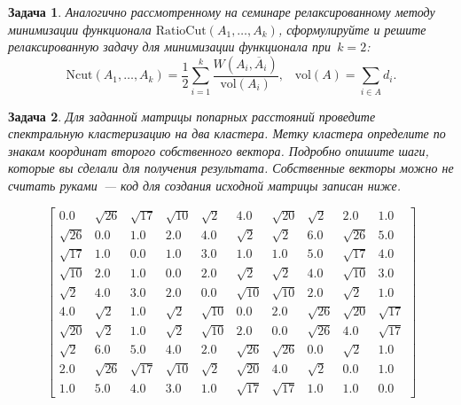 \documentclass[12pt,fleqn]{article}
\newtheorem{esProblem}{Задача}
\begin{document}
\begin{esProblem}
	Аналогично рассмотренному на семинаре релаксированному методу минимизации функционала $\text{RatioCut}(A_1,\ldots,A_k)$, сформулируйте и решите релаксированную задачу для минимизации функционала при~$k = 2$:
	\[
	\text{Ncut}(A_1,\ldots,A_k) = \frac12 \sum_{i=1}^k\frac{W(A_i, \overline{A}_i)}{\text{vol}(A_i)}, \;\;\; \text{vol}(A) = \sum_{i\in A} d_i.
	\]
\end{esProblem}

\begin{esProblem}

Для заданной матрицы попарных расстояний проведите спектральную кластеризацию на два кластера.
Метку кластера определите по знакам координат второго собственного вектора.
Подробно опишите шаги, которые вы сделали для получения результата.
Собственные векторы можно не считать руками~--- код для создания исходной матрицы записан ниже.

\[
\begin{bmatrix}
0.0 & \sqrt{26} & \sqrt{17} & \sqrt{10} & \sqrt{2} & 4.0 & \sqrt{20} & \sqrt{2} & 2.0 & 1.0 \\
\sqrt{26} & 0.0 & 1.0 & 2.0 & 4.0 & \sqrt{2} & \sqrt{2} & 6.0 & \sqrt{26} & 5.0 \\
\sqrt{17} & 1.0 & 0.0 & 1.0 & 3.0 & 1.0 & 1.0 & 5.0 & \sqrt{17} & 4.0 \\
\sqrt{10} & 2.0 & 1.0 & 0.0 & 2.0 & \sqrt{2} & \sqrt{2} & 4.0 & \sqrt{10} & 3.0 \\
\sqrt{2} & 4.0 & 3.0 & 2.0 & 0.0 & \sqrt{10} & \sqrt{10} & 2.0 & \sqrt{2} & 1.0 \\
4.0 & \sqrt{2} & 1.0 & \sqrt{2} & \sqrt{10} & 0.0 & 2.0 & \sqrt{26} & \sqrt{20} & \sqrt{17} \\
\sqrt{20} & \sqrt{2} & 1.0 & \sqrt{2} & \sqrt{10} & 2.0 & 0.0 & \sqrt{26} & 4.0 & \sqrt{17} \\
\sqrt{2} & 6.0 & 5.0 & 4.0 & 2.0 & \sqrt{26} & \sqrt{26} & 0.0 & \sqrt{2} & 1.0 \\
2.0 & \sqrt{26} & \sqrt{17} & \sqrt{10} & \sqrt{2} & \sqrt{20} & 4.0 & \sqrt{2} & 0.0 & 1.0 \\
1.0 & 5.0 & 4.0 & 3.0 & 1.0 & \sqrt{17} & \sqrt{17} & 1.0 & 1.0 & 0.0
\end{bmatrix}
\]


\end{esProblem}
\end{document}
